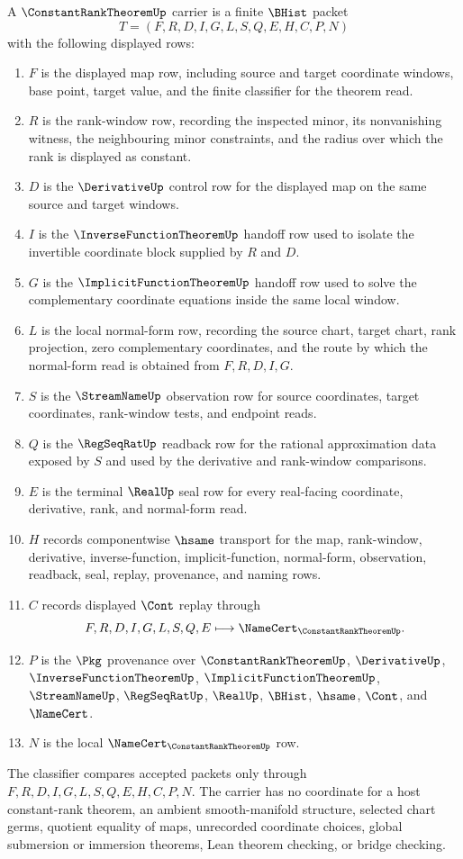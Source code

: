 \begin{definition}
\label{def:constant-rank-theorem-carrier}
A $\ConstantRankTheoremUp$ carrier is a finite $\BHist$ packet
$$
T=(F,R,D,I,G,L,S,Q,E,H,C,P,N)
$$
with the following displayed rows:
\begin{enumerate}
\item $F$ is the displayed map row, including source and target coordinate windows, base point, target value, and the finite classifier for the theorem read.
\item $R$ is the rank-window row, recording the inspected minor, its nonvanishing witness, the neighbouring minor constraints, and the radius over which the rank is displayed as constant.
\item $D$ is the $\DerivativeUp$ control row for the displayed map on the same source and target windows.
\item $I$ is the $\InverseFunctionTheoremUp$ handoff row used to isolate the invertible coordinate block supplied by $R$ and $D$.
\item $G$ is the $\ImplicitFunctionTheoremUp$ handoff row used to solve the complementary coordinate equations inside the same local window.
\item $L$ is the local normal-form row, recording the source chart, target chart, rank projection, zero complementary coordinates, and the route by which the normal-form read is obtained from $F,R,D,I,G$.
\item $S$ is the $\StreamNameUp$ observation row for source coordinates, target coordinates, rank-window tests, and endpoint reads.
\item $Q$ is the $\RegSeqRatUp$ readback row for the rational approximation data exposed by $S$ and used by the derivative and rank-window comparisons.
\item $E$ is the terminal $\RealUp$ seal row for every real-facing coordinate, derivative, rank, and normal-form read.
\item $H$ records componentwise $\hsame$ transport for the map, rank-window, derivative, inverse-function, implicit-function, normal-form, observation, readback, seal, replay, provenance, and naming rows.
\item $C$ records displayed $\Cont$ replay through
$$
F,R,D,I,G,L,S,Q,E \longmapsto \NameCert_{\ConstantRankTheoremUp}.
$$
\item $P$ is the $\Pkg$ provenance over $\ConstantRankTheoremUp$, $\DerivativeUp$, $\InverseFunctionTheoremUp$, $\ImplicitFunctionTheoremUp$, $\StreamNameUp$, $\RegSeqRatUp$, $\RealUp$, $\BHist$, $\hsame$, $\Cont$, and $\NameCert$.
\item $N$ is the local $\NameCert_{\ConstantRankTheoremUp}$ row.
\end{enumerate}
The classifier compares accepted packets only through $F,R,D,I,G,L,S,Q,E,H,C,P,N$. The carrier has no coordinate for a host constant-rank theorem, an ambient smooth-manifold structure, selected chart germs, quotient equality of maps, unrecorded coordinate choices, global submersion or immersion theorems, Lean theorem checking, or bridge checking.
\end{definition}

